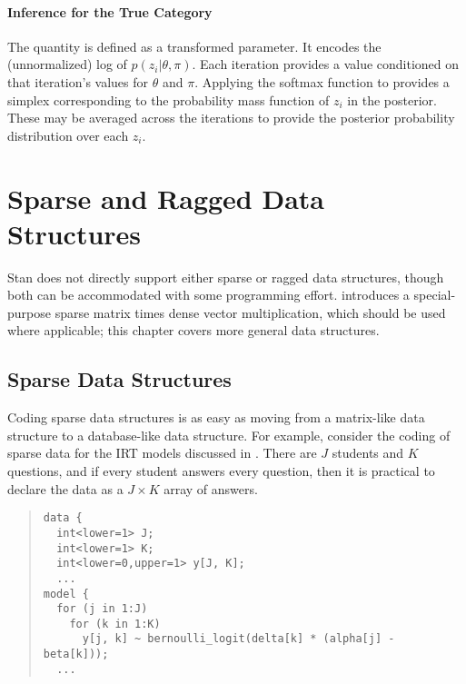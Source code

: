 \subsubsection{Inference for the True Category}

The quantity  is defined as a transformed
parameter.  It encodes the (unnormalized) log of $p(z_i | \theta,
\pi)$.  Each iteration provides a value conditioned on that
iteration's values for $\theta$ and $\pi$.  Applying the softmax
function to  provides a simplex corresponding to
the probability mass function of $z_i$ in the posterior.   These may
be averaged across the iterations to provide the posterior probability
distribution over each $z_i$.


\chapter{Sparse and Ragged Data Structures}\label{sparse-ragged.chapter}

\noindent
Stan does not directly support either sparse or ragged data
structures, though both can be accommodated with some programming
effort.   introduces a special-purpose
sparse matrix times dense vector multiplication, which should be used
where applicable;  this chapter covers more general data structures.

\section{Sparse Data Structures}

Coding sparse data structures is as easy as moving from a matrix-like
data structure to a database-like data structure.  For example,
consider the coding of sparse data for the IRT models discussed in
.  There are $J$ students and $K$
questions, and if every student answers every question, then it is
practical to declare the data as a $J \times K$ array of answers.
%
\begin{quote}
\begin{Verbatim}
data {
  int<lower=1> J;
  int<lower=1> K;
  int<lower=0,upper=1> y[J, K];
  ...
model {
  for (j in 1:J)
    for (k in 1:K)
      y[j, k] ~ bernoulli_logit(delta[k] * (alpha[j] - beta[k]));
  ...
\end{Verbatim}
\end{quote}
%

